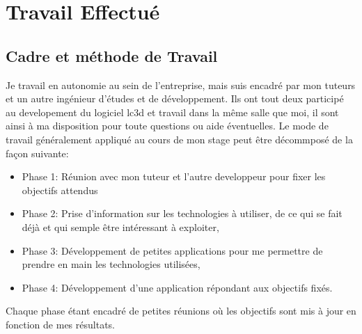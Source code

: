 \section{Travail Effectué}

\subsection{Cadre et méthode de Travail}
Je travail en autonomie au sein de l'entreprise, mais suis encadré par mon tuteurs et un autre ingénieur d'études et de développement. Ils ont tout deux participé au developement du logiciel \gls{lc3d} et travail dans la même salle que moi, il sont ainsi à ma disposition pour toute questions ou aide éventuelles. Le mode de travail généralement appliqué au cours de mon stage peut être décommposé de la façon suivante:
\begin{itemize}
    \item{Phase 1:} Réunion avec mon tuteur et l'autre developpeur pour fixer les objectifs attendus
    \item{Phase 2:} Prise d'information sur les technologies à utiliser, de ce qui se fait déjà et qui semple être intéressant à exploiter,
    \item{Phase 3:} Développement de petites applications pour me permettre de prendre en main les technologies utilisées,
    \item{Phase 4:} Développement d'une application répondant aux objectifs fixés.
    
\end{itemize}

Chaque phase étant encadré de petites réunions où les objectifs sont mis à jour en fonction de mes résultats.








